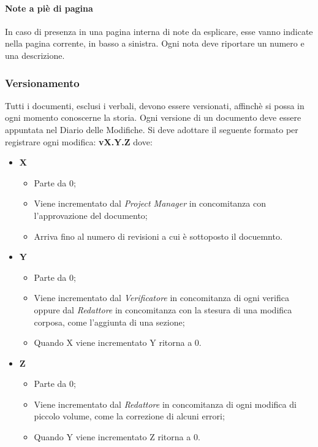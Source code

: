 		\paragraph{Note a piè di pagina} \Spazio
		In caso di presenza in una pagina interna di note da esplicare, esse vanno indicate nella pagina corrente, in basso a sinistra. Ogni nota deve riportare un numero e una	descrizione.
		
	\subsubsection{Versionamento}
	\label{versionamento}
	Tutti i documenti, esclusi i verbali, devono essere versionati, affinchè si possa in ogni momento conoscerne la storia. Ogni versione di un documento deve essere appuntata nel Diario delle Modifiche. Si deve adottare il seguente formato per registrare ogni modifica: 
	\textbf{v{X}.{Y}.{Z}}
	dove:
	\begin{itemize}
		\item \textbf{X}
		\begin{itemize}
			\item Parte da 0;
			\item Viene incrementato dal \textit{Project Manager} in concomitanza con l'approvazione del documento;
			\item Arriva fino al numero di revisioni a cui è sottoposto il docuemnto.
		\end{itemize}
		
		\item \textbf{Y}
		\begin{itemize}
			\item Parte da 0;
			\item Viene incrementato dal \emph{Verificatore} in concomitanza di ogni verifica oppure dal \emph{Redattore} in concomitanza con la stesura di una modifica corposa, come l'aggiunta di una sezione;
			\item Quando X viene incrementato Y ritorna a 0.
		\end{itemize}
		
		\item \textbf{Z}
		\begin{itemize}
			\item Parte da 0;
			\item Viene incrementato dal \textit{Redattore} in concomitanza di ogni modifica di piccolo volume, come la correzione di alcuni errori;
			\item Quando Y viene incrementato Z	 ritorna a 0.
		\end{itemize}
		
	\end{itemize}
	
